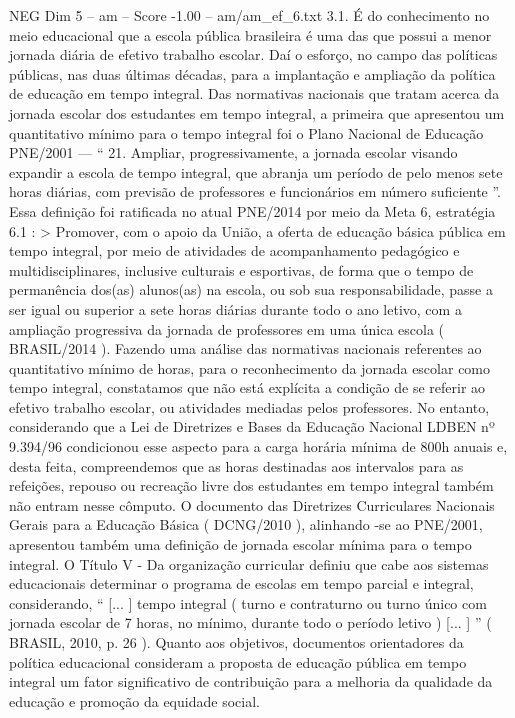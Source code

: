 \begin{textsample}{NEG Dim 5 – am – Score -1.00 – am/am\_ef\_6.txt}  \label{ex:f5_neg_227}
3.1.
É do conhecimento no meio educacional que a escola pública brasileira é uma das que possui a menor jornada diária de efetivo trabalho escolar.
Daí o esforço, no campo das políticas públicas, nas duas últimas décadas, para a implantação e ampliação da política de educação em tempo integral.
Das normativas nacionais que tratam acerca da jornada escolar dos estudantes em tempo integral, a primeira que apresentou um quantitativo mínimo para o tempo integral foi o Plano Nacional de Educação PNE/2001 — “ 21.
Ampliar, progressivamente, a jornada escolar visando expandir a escola de tempo integral, que abranja um período de pelo menos sete horas diárias, com previsão de professores e funcionários em número suficiente ”.
Essa definição foi ratificada no atual PNE/2014 por meio da Meta 6, estratégia 6.1 : > Promover, com o apoio da União, a oferta de educação básica pública em tempo integral, por meio de atividades de acompanhamento pedagógico e multidisciplinares, inclusive culturais e esportivas, de forma que o tempo de permanência dos(as) alunos(as) na escola, ou sob sua responsabilidade, passe a ser igual ou superior a sete horas diárias durante todo o ano letivo, com a ampliação progressiva da jornada de professores em uma única escola ( BRASIL/2014 ).
Fazendo uma análise das normativas nacionais referentes ao quantitativo mínimo de horas, para o reconhecimento da jornada escolar como tempo integral, constatamos que não está explícita a condição de se referir ao efetivo trabalho escolar, ou atividades mediadas pelos professores.
No entanto, considerando que a Lei de Diretrizes e Bases da Educação Nacional LDBEN nº 9.394/96 condicionou esse aspecto para a carga horária mínima de 800h anuais e, desta feita, compreendemos que as horas destinadas aos intervalos para as refeições, repouso ou recreação livre dos estudantes em tempo integral também não entram nesse cômputo.
O documento das Diretrizes Curriculares Nacionais Gerais para a Educação Básica ( DCNG/2010 ), alinhando -se ao PNE/2001, apresentou também uma definição de jornada escolar mínima para o tempo integral.
O Título V - Da organização curricular definiu que cabe aos sistemas educacionais determinar o programa de escolas em tempo parcial e integral, considerando, “ [... ] tempo integral ( turno e contraturno ou turno único com jornada escolar de 7 horas, no mínimo, durante todo o período letivo ) [... ] ” ( BRASIL, 2010, p. 26 ).
Quanto aos objetivos, documentos orientadores da política educacional consideram a proposta de educação pública em tempo integral um fator significativo de contribuição para a melhoria da qualidade da educação e promoção da equidade social.

\end{textsample}
